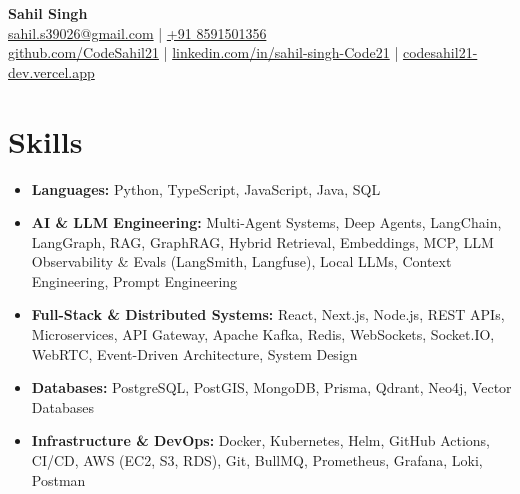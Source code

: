 \documentclass[a4paper,10pt]{article}
\begin{document}
\begin{center}
{\color[HTML]{1C033C}\Huge \textbf{Sahil Singh}} \\[4pt]
\href{mailto:sahil.s39026@gmail.com}{sahil.s39026@gmail.com} \quad | \quad \href{tel:+918591501356}{+91 8591501356} \\
\href{https://github.com/CodeSahil21}{github.com/CodeSahil21} \quad | \quad \href{https://linkedin.com/in/sahil-singh-Code21}{linkedin.com/in/sahil-singh-Code21} \quad | \quad \href{https://codesahil21-dev.vercel.app/}{codesahil21-dev.vercel.app}
\end{center}

\section{Skills}
\begin{itemize}[leftmargin=0pt, label={}, itemsep=1pt, topsep=1pt]
  \item \textbf{Languages:} Python, TypeScript, JavaScript, Java, SQL
  \item \textbf{AI \& LLM Engineering:} Multi-Agent Systems, Deep Agents, LangChain, LangGraph, RAG, GraphRAG, Hybrid Retrieval, Embeddings, MCP, LLM Observability \& Evals (LangSmith, Langfuse), Local LLMs, Context Engineering, Prompt Engineering
  \item \textbf{Full-Stack \& Distributed Systems:} React, Next.js, Node.js, REST APIs, Microservices, API Gateway, Apache Kafka, Redis, WebSockets, Socket.IO, WebRTC, Event-Driven Architecture, System Design
  \item \textbf{Databases:} PostgreSQL, PostGIS, MongoDB, Prisma, Qdrant, Neo4j, Vector Databases
  \item \textbf{Infrastructure \& DevOps:} Docker, Kubernetes, Helm, GitHub Actions, CI/CD, AWS (EC2, S3, RDS), Git, BullMQ, Prometheus, Grafana, Loki, Postman
\end{itemize}

\end{document}
